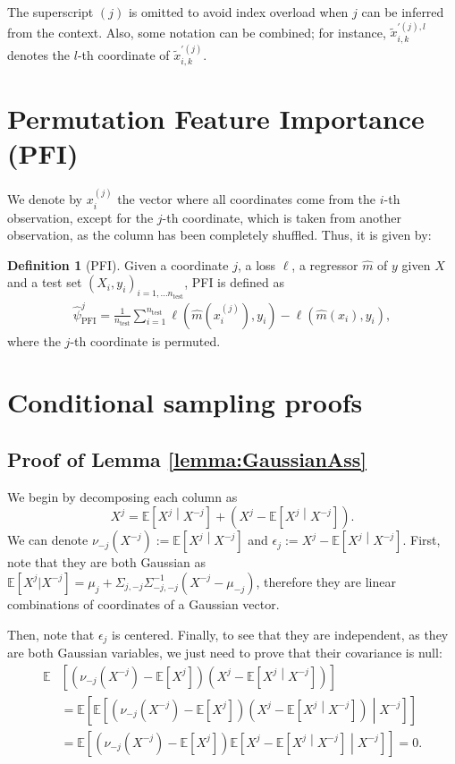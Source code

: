 \documentclass{article}
\theoremstyle{plain}
\theoremstyle{definition}
\newtheorem{definition}[theorem]{Definition}
\theoremstyle{remark}
\newcommand{\e}[1]{\mathbb{E}\left[#1\right]  } %
\begin{document}
The superscript $(j)$ is omitted to avoid index overload when $j$ can be inferred from the context. Also, some notation can be combined; for instance, $\widetilde{x}^{'(j),l}_{i,k}$ denotes the $l$-th coordinate of $\widetilde{x}^{'(j)}_{i,k}$.


\section{Permutation Feature Importance (PFI)}\label{sect:PFI}

We denote by $x_{i}^{(j)}$ the vector where all coordinates come from the $i$-th observation, except for the $j$-th coordinate, which is taken from another observation, as the column has been completely shuffled. Thus, it is given by:

\begin{definition}[PFI] Given a coordinate $j$, a loss $\ell$, a regressor $\widehat{m}$ of $y$ given $X$ and a test set $(X_i, y_i)_{i=1,\ldots n_\mathrm{test}}$, PFI is defined as
\begin{align*}
    \widehat{\psi}_\mathrm{PFI}^j=\frac{1}{n_{\mathrm{test}}}\sum_{i=1}^{n_{\mathrm{test}}}\ell\left(\widehat{m}(x_{i}^{(j)}),y_i\right)-\ell\left(\widehat{m}(x_{i}),y_i\right),
\end{align*}
where the $j$-th coordinate is permuted.
\end{definition}

\section{Conditional sampling proofs}
\subsection{Proof of Lemma \ref{lemma:GaussianAss}}
We begin by decomposing each column as $$X^j=\e{X^j\middle|X^{-j}}+\left(X^j-\e{X^j\middle|X^{-j}}\right).$$ 
 We can denote $\nu_{-j}(X^{-j}):=\e{X^j\middle|X^{-j}}$ and $\epsilon_j:=X^j-\e{X^j\middle|X^{-j}}$. First, note that they are both Gaussian as $\e{X^j|X^{-j}}=\mu_{j}+\Sigma_{j, -j}\Sigma^{-1}_{-j, -j}(X^{-j}-\mu_{-j})$, therefore they are linear combinations of coordinates of a Gaussian vector.
 
 Then, note that $\epsilon_j$ is centered. Finally, to see that they are independent, as they are both Gaussian variables, we just need to prove that their covariance is null:
 \begin{align*}
     \mathbb{E}&\left[\left(\nu_{-j}\left(X^{-j}\right)-\e{X^{j}}\right)\left(X^j-\e{X^j\middle|X^{-j}}\right)\right]\\&=
     \e{\e{\left(\nu_{-j}\left(X^{-j}\right)-\e{X^{j}}\right)\left(X^j-\e{X^j\middle|X^{-j}}\right)\middle|X^{-j}}}\\&=\e{\left(\nu_{-j}\left(X^{-j}\right)-\e{X^{j}}\right)\e{X^j-\e{X^j\middle|X^{-j}}\middle|X^{-j}}}=
     0.
 \end{align*}
 
\end{document}
